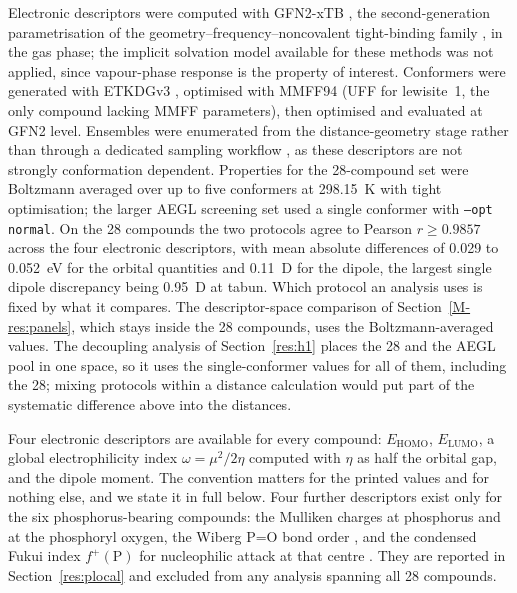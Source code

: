 \documentclass[11pt,a4paper]{article}
\begin{document}
Electronic descriptors were computed with GFN2-xTB
\cite{bannwarth2019}, the second-generation parametrisation of the
geometry--frequency--noncovalent tight-binding family \cite{gfnxtb2017,
xtbreview2021}, in the gas phase; the implicit solvation model available for
these methods \cite{ehlert2021} was not applied, since vapour-phase response is
the property of interest. Conformers were generated with ETKDGv3 \cite{wang2020,riniker2015}, optimised
with MMFF94 \cite{halgren1996} (UFF \cite{rappe1992} for lewisite~1, the only
compound lacking MMFF parameters), then optimised and evaluated at GFN2 level.
Ensembles were enumerated from the distance-geometry stage rather than through a
dedicated sampling workflow \cite{pracht2020}, as these descriptors are not
strongly conformation dependent. Properties for the 28-compound set were
Boltzmann averaged over up to five conformers at 298.15~K with tight
optimisation; the larger AEGL screening set used a single conformer with
\texttt{--opt normal}. On the 28 compounds the two protocols agree to Pearson
$r \ge 0.9857$ across the four electronic descriptors, with mean absolute
differences of 0.029 to 0.052~eV for the orbital quantities and 0.11~D for the
dipole, the largest single dipole discrepancy being 0.95~D at tabun. Which
protocol an analysis uses is fixed by what it compares. The descriptor-space comparison of
Section~\ref{M-res:panels}, which stays inside the 28 compounds, uses the
Boltzmann-averaged values. The decoupling analysis of Section~\ref{res:h1}
places the 28 and the AEGL pool in one space, so it uses the single-conformer
values for all of them, including the 28; mixing protocols within a distance
calculation would put part of the systematic difference above into the
distances.

Four electronic descriptors are available for every compound: $E_\mathrm{HOMO}$,
$E_\mathrm{LUMO}$, a global electrophilicity index
$\omega=\mu^{2}/2\eta$ computed with $\eta$ as half the orbital gap, and the dipole
moment. The convention matters for the printed values and for nothing else, and
we state it in full below. Four further descriptors exist only for the six phosphorus-bearing
compounds: the Mulliken charges at phosphorus and at the phosphoryl oxygen, the
Wiberg P=O bond order \cite{wiberg1968}, and the condensed Fukui index
$f^{+}(\mathrm{P})$ for nucleophilic attack at that centre
\cite{parryang1984,yangmortier1986,geerlings2003}. They are reported in
Section~\ref{res:plocal} and excluded from any analysis spanning
all 28 compounds.
\end{document}
